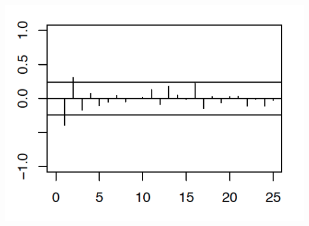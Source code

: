 \documentclass[11pt]{article} %
\begin{document}
\begin{enumerate}
\includegraphics[scale = .5]{plot2.png}

\end{enumerate}
\end{document}
